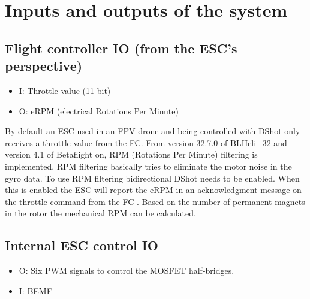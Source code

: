 \documentclass[]{report}
\begin{document}
\section{Inputs and outputs of the system}
\subsection{Flight controller IO (from the ESC's perspective)}
\begin{itemize}
	\item I: Throttle value (11-bit)
	\item O: eRPM (electrical Rotations Per Minute)
\end{itemize}


By default an ESC used in an FPV drone and being controlled with DShot only receives a throttle value from the FC. From version 32.7.0 of BLHeli\_32 and version 4.1 of Betaflight on, RPM (Rotations Per Minute) filtering is implemented. RPM filtering basically tries to eliminate the motor noise in the gyro data. To use RPM filtering bidirectional DShot needs to be enabled. When this is enabled the ESC will report the eRPM in an acknowledgment message on the throttle command from the FC \cite{Betaflight_RPM_Filtering}. Based on the number of permanent magnets in the rotor the mechanical RPM can be calculated.

\subsection{Internal ESC control IO}
\begin{itemize}
	\item O: Six PWM signals to control the MOSFET half-bridges.
	\item I: BEMF
\end{itemize}
\end{document}
